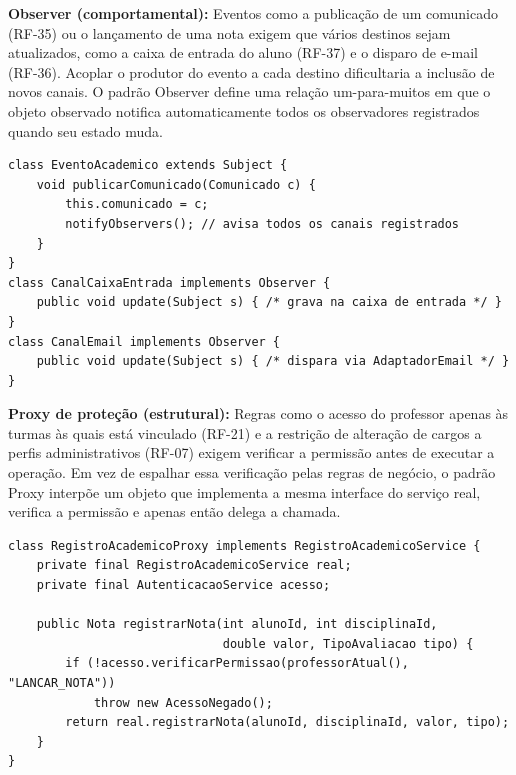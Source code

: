 \textbf{Observer (comportamental):} Eventos como a publicação de um comunicado
(RF-35) ou o lançamento de uma nota exigem que vários destinos sejam
atualizados, como a caixa de entrada do aluno (RF-37) e o disparo de e-mail
(RF-36). Acoplar o produtor do evento a cada destino dificultaria a inclusão de
novos canais. O padrão Observer define uma relação um-para-muitos em que o
objeto observado notifica automaticamente todos os observadores registrados
quando seu estado muda.

\begin{lstlisting}
class EventoAcademico extends Subject {
    void publicarComunicado(Comunicado c) {
        this.comunicado = c;
        notifyObservers(); // avisa todos os canais registrados
    }
}
class CanalCaixaEntrada implements Observer {
    public void update(Subject s) { /* grava na caixa de entrada */ }
}
class CanalEmail implements Observer {
    public void update(Subject s) { /* dispara via AdaptadorEmail */ }
}
\end{lstlisting}

\textbf{Proxy de proteção (estrutural):} Regras como o acesso do professor
apenas às turmas às quais está vinculado (RF-21) e a restrição de alteração de
cargos a perfis administrativos (RF-07) exigem verificar a permissão antes de
executar a operação. Em vez de espalhar essa verificação pelas regras de
negócio, o padrão Proxy interpõe um objeto que implementa a mesma interface do
serviço real, verifica a permissão e apenas então delega a chamada.

\begin{lstlisting}
class RegistroAcademicoProxy implements RegistroAcademicoService {
    private final RegistroAcademicoService real;
    private final AutenticacaoService acesso;

    public Nota registrarNota(int alunoId, int disciplinaId,
                              double valor, TipoAvaliacao tipo) {
        if (!acesso.verificarPermissao(professorAtual(), "LANCAR_NOTA"))
            throw new AcessoNegado();
        return real.registrarNota(alunoId, disciplinaId, valor, tipo);
    }
}
\end{lstlisting}
